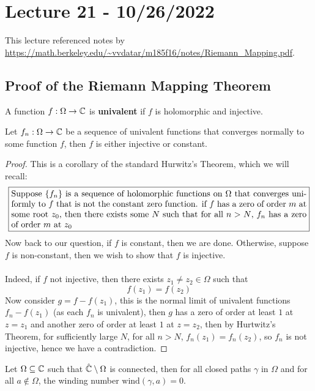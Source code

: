 \section{Lecture 21 - 10/26/2022}

This lecture referenced notes by \url{https://math.berkeley.edu/~vvdatar/m185f16/notes/Riemann_Mapping.pdf}.

\subsection{Proof of the Riemann Mapping Theorem}

\begin{definition}
    A function $f: \Omega \to \mathbb{C}$ is \textbf{univalent} if $f$ is holomorphic and injective.
\end{definition}

\begin{theorem}
    Let $f_n: \Omega \to \mathbb{C}$ be a sequence of univalent functions that converges normally to some function $f$, then $f$ is either injective or constant.
\end{theorem}

\begin{proof}
    This is a corollary of the standard Hurwitz's Theorem, which we will recall:
    \[\noindent\fbox{%
    \parbox{\textwidth}{%
Suppose $\{f_n\}$ is a sequence of holomorphic functions on $\Omega$ that converges uniformly to $f$ that is not the constant zero function. if $f$ has a zero of order $m$ at some root $z_0$, then there exists some $N$ such that for all $n > N$, $f_n$ has a zero of order $m$ at $z_0$
    }%
}\]
Now back to our question, if $f$ is constant, then we are done. Otherwise, suppose $f$ is non-constant, then we wish to show that $f$ is injective.\\\\
Indeed, if $f$ not injective, then there exists $z_1 \neq z_2 \in \Omega$ such that
\[f(z_1) = f(z_2)\]
Now consider $g = f - f(z_1)$, this is the normal limit of univalent functions $f_n - f(z_1)$ (as each $f_n$ is univalent), then $g$ has a zero of order at least $1$ at $z = z_1$ and another zero of order at least $1$ at $z = z_2$, then by Hurtwitz's Theorem, for sufficiently large $N$, for all $n > N$, $f_n(z_1) = f_n(z_2)$, so $f_n$ is not injective, hence we have a contradiction. 
\end{proof}

\begin{lemma}
    Let $\Omega \subseteq \mathbb{C}$ such that $\hat{\mathbb{C}} \setminus \Omega$ is connected, then for all closed paths $\gamma$ in $\Omega$ and for all $a \notin \Omega$, the winding number $\text{wind}(\gamma, a) = 0$.
\end{lemma}

